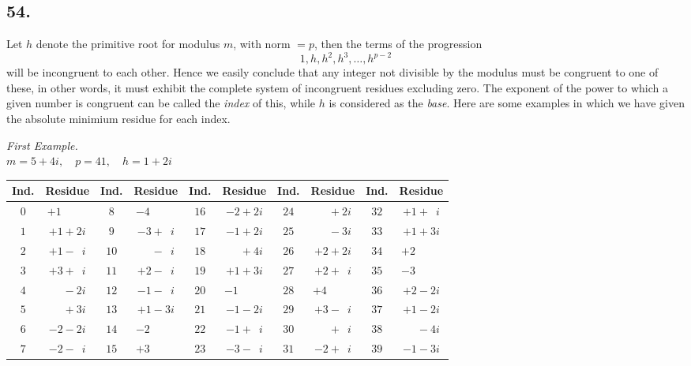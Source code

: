\documentclass[twoside,12pt, showframe]{memoir}
\begin{document}
\subsection*{54.}

Let \(h\) denote the primitive root for modulus \(m\), with norm \(=p\), then the terms of the progression
\[1, h, h^{2}, h^{3}, \ldots, h^{p-2}\]
will be incongruent to each other. Hence we easily conclude that any integer not divisible by the modulus must be congruent to one of these, in other words, it must exhibit the complete system of incongruent residues excluding zero. The exponent of the power to which a given number is congruent can be called the \textit{index} of this, while \(h\) is considered as the \textit{base}. Here are some examples in which we have given the absolute minimium residue for each index.
\begin{center}
\textit{First Example.}\\
\(m=5+4 i, \quad p=41, \quad h=1+2 i\)\\
\begin{tabular}{c|c||c|c||c|c||c|c||c|c}
Ind. & Residue & Ind. &Residue & Ind. & Residue & Ind. & Residue & Ind. & Residue \\
\hline
\(0\) & \(+1\phantom{\;+0i}\) & \(8\) & \(-4\phantom{\;+0i}\) & \(16 \)& \(-2+2 i\) & \(24\) & \(\phantom{+0}+2 i\) & \(32 \)& \(+1+\phantom{1}i\) \\
\(1\) & \(+1+2 i\) & \(9\) & \(-3+\phantom{1}i\) & \(17\) & \(-1+2 i\) & \(25\) & \(\phantom{+0}-3 i\) & \(33\) & \(+1+3 i\) \\
\(2\) & \(+1-\phantom{1}i\) & \(10\) & \(\phantom{+0}-\phantom{1}i\) & \(18\) & \(\phantom{+0}+4 i\) & \(26\) & \(+2+2 i\) & \(34\) & \(+2\phantom{\;+0i}\) \\
\(3\) & \(+3+\phantom{1}i\) & \(11\) & \(+2-\phantom{1}i\) & \(19\) & \(+1+3 i\) & \(27\) & \(+2+\phantom{1}i\) & \(35\) & \(-3\phantom{\;+0i}\)\\
\(4\) & \(\phantom{+0}-2 i\) & \(12\) & \(-1-\phantom{1}i\) & \(20\) & \(-1\phantom{\;+0i}\) & \(28\) & \(+4\phantom{\;+0i}\) & \(36\) & \(+2-2 i\) \\
\(5\) & \(\phantom{+0}+3 i\) & \(13\) & \(+1-3 i\) & \(21\) & \(-1-2 i\) & \(29\) & \(+3-\phantom{1}i\) & \(37\) & \(+1-2 i\) \\
\(6\) & \(-2-2 i\) & \(14\) & \(-2\phantom{\;+0i}\) & \(22\) & \(-1+\phantom{1}i\) & \(30\) & \(\phantom{+0}+\phantom{1}i\) & \(38\) & \(\phantom{+0}-4 i\) \\
\(7\) & \(-2-\phantom{1}i\) & \(15\) & \(+3\phantom{\;+0i}\) & \(23\) & \(-3-\phantom{1}i\) & \(31\) & \(-2+\phantom{1}i\) & \(39\) & \(-1-3 i\) \\
\end{tabular}
\end{center}
%
\end{document}
